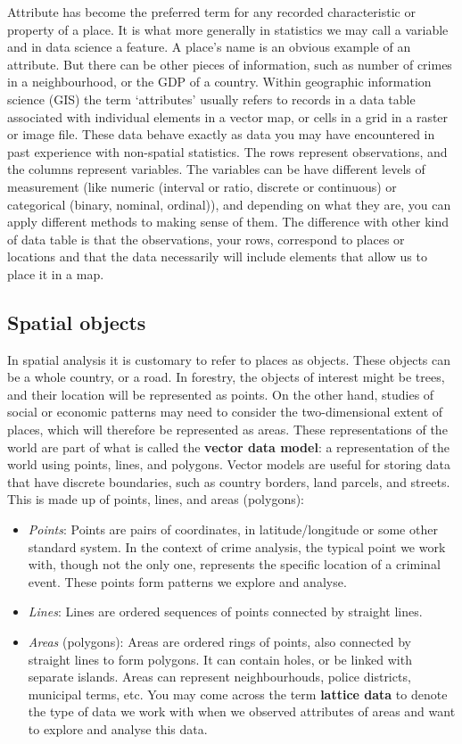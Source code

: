 \documentclass[
]{book}
\providecommand{\tightlist}{%
  \setlength{\itemsep}{0pt}\setlength{\parskip}{0pt}}
\begin{document}
Attribute has become the preferred term for any recorded characteristic or property of a place. It is what more generally in statistics we may call a variable and in data science a feature. A place's name is an obvious example of an attribute. But there can be other pieces of information, such as number of crimes in a neighbourhood, or the GDP of a country. Within geographic information science (GIS) the term `attributes' usually refers to records in a data table associated with individual elements in a vector map, or cells in a grid in a raster or image file. These data behave exactly as data you may have encountered in past experience with non-spatial statistics. The rows represent observations, and the columns represent variables. The variables can be have different levels of measurement (like numeric (interval or ratio, discrete or continuous) or categorical (binary, nominal, ordinal)), and depending on what they are, you can apply different methods to making sense of them. The difference with other kind of data table is that the observations, your rows, correspond to places or locations and that the data necessarily will include elements that allow us to place it in a map.

\hypertarget{spatial-objects}{%
\subsection{Spatial objects}\label{spatial-objects}}

In spatial analysis it is customary to refer to places as objects. These objects can be a whole country, or a road. In forestry, the objects of interest might be trees, and their location will be represented as points. On the other hand, studies of social or economic patterns may need to consider the two-dimensional extent of places, which will therefore be represented as areas. These representations of the world are part of what is called the \textbf{vector data model}: a representation of the world using points, lines, and polygons. Vector models are useful for storing data that have discrete boundaries, such as country borders, land parcels, and streets. This is made up of points, lines, and areas (polygons):

\begin{itemize}
\tightlist
\item
  \emph{Points}: Points are pairs of coordinates, in latitude/longitude or some other standard system. In the context of crime analysis, the typical point we work with, though not the only one, represents the specific location of a criminal event. These points form patterns we explore and analyse.
\item
  \emph{Lines}: Lines are ordered sequences of points connected by straight lines.
\item
  \emph{Areas} (polygons): Areas are ordered rings of points, also connected by straight lines to form polygons. It can contain holes, or be linked with separate islands. Areas can represent neighbourhouds, police districts, municipal terms, etc. You may come across the term \textbf{lattice data} to denote the type of data we work with when we observed attributes of areas and want to explore and analyse this data.
\end{itemize}
\end{document}

